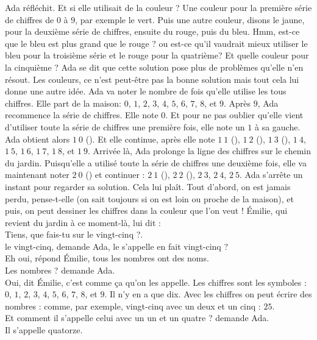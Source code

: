 Ada réfléchit. Et si elle utilisait de la couleur ? 
Une couleur pour la première série de chiffres de $0$ à $9$, par exemple le vert. Puis une autre couleur, disons le jaune, pour la deuxième série de chiffres, ensuite du rouge, puis du bleu. Hmm, est-ce que le bleu est plus grand que le rouge ? ou est-ce qu’il vaudrait mieux utiliser le bleu pour la troisième série et le rouge pour la quatrième? Et quelle couleur pour la cinquième ? Ada se dit que cette solution pose plus de problèmes qu’elle n’en résout.  
Les couleurs, ce n’est peut-être pas la bonne solution mais tout cela lui donne une autre idée. Ada va noter le nombre de fois qu’elle utilise les tous chiffres. Elle part de la maison: $0$, $1$, $2$, $3$, $4$, $5$, $6$, $7$, $8$, et $9$. Après $9$, Ada recommence la série de chiffres. Elle note $0$. Et pour ne pas oublier qu’elle vient d’utiliser toute la série de chiffres une première fois, elle note un $1$ à sa gauche. Ada obtient alors $1~0$ (). Et elle continue, après elle note $1~1$ (), $1~2$ (), $1~3$ (), $1~4$, $1~5$, $1~6$, $1~7$, $1~8$, et $1~9$. 
Arrivée là, Ada prolonge la ligne des chiffres sur le chemin du jardin. 
Puisqu’elle a utilisé toute la série de chiffres une deuxième fois, elle va maintenant noter $2~0$ () et continuer : $2~1$ (), $2~2$ (), $2~3$, $2~4$, $2~5$. 
Ada s'arrête un instant pour regarder sa solution. Cela lui plaît. Tout d’abord, on est jamais perdu, pense-t-elle (on sait toujours si on est loin ou proche de la maison), et puis, on peut dessiner les chiffres dans la couleur que l’on veut ! 
Émilie, qui revient du jardin à ce moment-là, lui dit :\\
\guillemotleft Tiens, que fais-tu sur le vingt-cinq ?. \\
\mdash le vingt-cinq, demande Ada, le  s’appelle en fait vingt-cinq ?\\
\mdash Eh oui, répond Émilie, tous les nombres ont des noms.\\
\mdash Les nombres ? demande Ada.\\
\mdash Oui, dit Émilie, c’est comme ça qu'on les appelle. Les chiffres sont les symboles : $0$, $1$, $2$, $3$, $4$, $5$, $6$, $7$, $8$, et $9$. Il n’y en a que dix. Avec les chiffres on peut écrire des nombres : comme, par exemple, vingt-cinq avec un deux et un cinq : $25$.\\
\mdash Et comment il s’appelle celui avec un un et un quatre ? demande Ada.\\
\mdash Il s'appelle quatorze.\\
